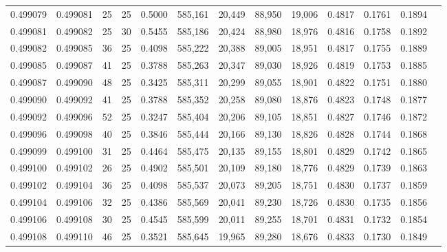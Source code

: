 \begin{tabular}{rrrrrrrrrrrrr}
0.499079 & 0.499081 &    25 &  25 &                                     0.5000 & 585,161 &  20,449 &  88,950 &  19,006 & 0.4817 & 0.1761 & 0.1894 \\
0.499081 & 0.499082 &    25 &  30 &                                     0.5455 & 585,186 &  20,424 &  88,980 &  18,976 & 0.4816 & 0.1758 & 0.1892 \\
0.499082 & 0.499085 &    36 &  25 &                                     0.4098 & 585,222 &  20,388 &  89,005 &  18,951 & 0.4817 & 0.1755 & 0.1889 \\
0.499085 & 0.499087 &    41 &  25 &                                     0.3788 & 585,263 &  20,347 &  89,030 &  18,926 & 0.4819 & 0.1753 & 0.1885 \\
0.499087 & 0.499090 &    48 &  25 &                                     0.3425 & 585,311 &  20,299 &  89,055 &  18,901 & 0.4822 & 0.1751 & 0.1880 \\
0.499090 & 0.499092 &    41 &  25 &                                     0.3788 & 585,352 &  20,258 &  89,080 &  18,876 & 0.4823 & 0.1748 & 0.1877 \\
0.499092 & 0.499096 &    52 &  25 &                                     0.3247 & 585,404 &  20,206 &  89,105 &  18,851 & 0.4827 & 0.1746 & 0.1872 \\
0.499096 & 0.499098 &    40 &  25 &                                     0.3846 & 585,444 &  20,166 &  89,130 &  18,826 & 0.4828 & 0.1744 & 0.1868 \\
0.499099 & 0.499100 &    31 &  25 &                                     0.4464 & 585,475 &  20,135 &  89,155 &  18,801 & 0.4829 & 0.1742 & 0.1865 \\
0.499100 & 0.499102 &    26 &  25 &                                     0.4902 & 585,501 &  20,109 &  89,180 &  18,776 & 0.4829 & 0.1739 & 0.1863 \\
0.499102 & 0.499104 &    36 &  25 &                                     0.4098 & 585,537 &  20,073 &  89,205 &  18,751 & 0.4830 & 0.1737 & 0.1859 \\
0.499104 & 0.499106 &    32 &  25 &                                     0.4386 & 585,569 &  20,041 &  89,230 &  18,726 & 0.4830 & 0.1735 & 0.1856 \\
0.499106 & 0.499108 &    30 &  25 &                                     0.4545 & 585,599 &  20,011 &  89,255 &  18,701 & 0.4831 & 0.1732 & 0.1854 \\
0.499108 & 0.499110 &    46 &  25 &                                     0.3521 & 585,645 &  19,965 &  89,280 &  18,676 & 0.4833 & 0.1730 & 0.1849 \\

\end{tabular}
